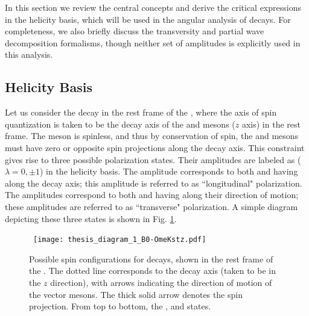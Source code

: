 In this section we review the central concepts and derive the critical expressions in the helicity basis, which will be used in the angular analysis of \BzToOmeKstz decays. For completeness, we also briefly discuss the transversity and partial wave decomposition formalisms, though neither set of amplitudes is explicitly used in this analysis.





\subsection{Helicity Basis\label{Helicity basis}}
Let us consider the \BzToOmeKstz decay in the rest frame of the \Bz, where the axis of spin quantization is taken to be the decay axis of the \Ome and \Kstz mesons ($z$ axis) in the \Bz rest frame. The \B meson is spinless, and thus by conservation of spin, the \Ome and \Kstz mesons must have zero or opposite spin projections along the decay axis. This constraint gives rise to three possible polarization states. Their amplitudes are labeled as \Alambda ($\lambda = 0,\pm1$) in the helicity basis. The amplitude \Az corresponds to both \Ome and \Kstz having \szZ along the decay axis; this amplitude is referred to as ``longitudinal" polarization. The \Apm amplitudes correspond to both \Ome and \Kstz having \szPM along their direction of motion; these amplitudes are referred to as ``transverse" polarization. A simple diagram depicting these three states is shown in Fig. \ref{helicity_amplitudes}. 
\begin{figure}[t]
\centerline{
\hbox{
\texttt{[image: thesis\_diagram\_1\_B0-OmeKstz.pdf]}\hspace{0.2cm} }}
\caption{Possible spin configurations for \BzToOmeKstz decays, shown in the rest frame of the \Bz. The dotted line corresponds to the decay axis (taken to be in the $z$ direction), with arrows indicating the direction of motion of the vector mesons. The thick solid arrow denotes the spin projection. From top to bottom, the \Az, \Ap and \Am states. \label{helicity_amplitudes}}
\vskip -0.2cm
\end{figure}

